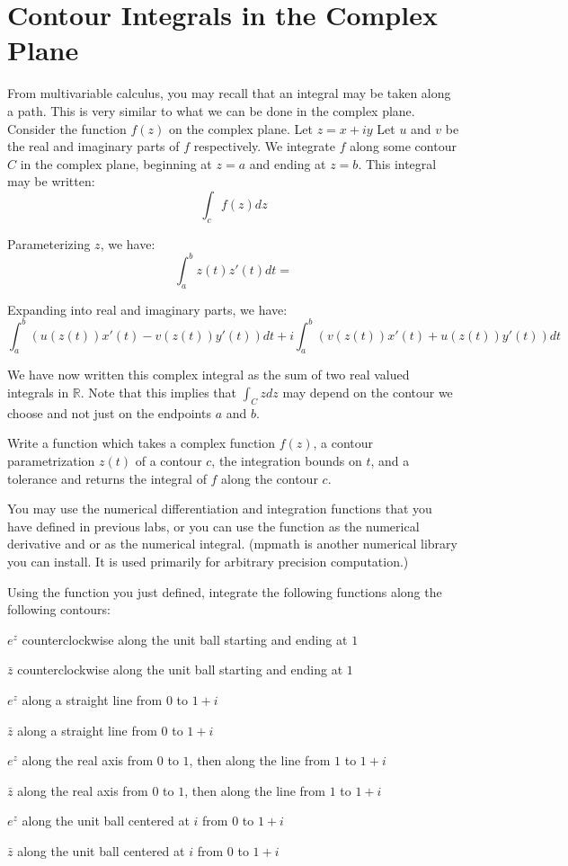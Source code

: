 

\section*{Contour Integrals in the Complex Plane}

From multivariable calculus, you may recall that an integral may be taken along a path. This is very similar to what we can be done in the complex plane. Consider the function $f(z)$ on the complex plane. Let $z=x+iy$ Let $u$ and $v$ be the real and imaginary parts of $f$ respectively. We integrate $f$ along some contour $C$ in the complex plane, beginning at $z=a$ and ending at $z=b$. This integral may be written: $$\int_c f(z)dz$$ 

Parameterizing $z$, we have: $$\int_a^b z(t)z'(t)dt=$$

Expanding into real and imaginary parts, we have:
$$\int_a^b (u(z(t))x'(t)-v(z(t))y'(t))dt +i \int_a^b(v(z(t))x'(t)+u(z(t))y'(t))dt$$

We have now written this complex integral as the sum of two real valued integrals in $\mathbb{R}$. Note that this implies that $\int_C z dz$ may depend on the contour we choose and not just on the endpoints $a$ and $b$.

\begin{problem}
Write a function which takes a complex function $f(z)$, a contour parametrization $z(t)$ of a contour $c$, the integration bounds on $t$, and a tolerance and returns the integral of $f$ along the contour $c$. 

You may use the numerical differentiation and integration functions that you have defined in previous labs, or you can use the function  as the numerical derivative and  or  as the numerical integral. (mpmath is another numerical library you can install. It is used primarily for arbitrary precision computation.)
\end {problem}
\begin{problem}
Using the function you just defined, integrate the following functions along the following contours:

$e^z$ counterclockwise along the unit ball starting and ending at $1$

$\bar{z}$ counterclockwise along the unit ball starting and ending at $1$

$e^z$ along a straight line from $0$ to $1+i$

$\bar{z}$ along a straight line from $0$ to $1+i$

$e^z$ along the real axis from $0$ to $1$, then along the line from $1$ to $1+i$

$\bar{z}$ along the real axis from $0$ to $1$, then along the line from $1$ to $1+i$

$e^z$ along the unit ball centered at $i$ from $0$ to $1+i$

$\bar{z}$ along the unit ball centered at $i$ from $0$ to $1+i$

\end{problem}

